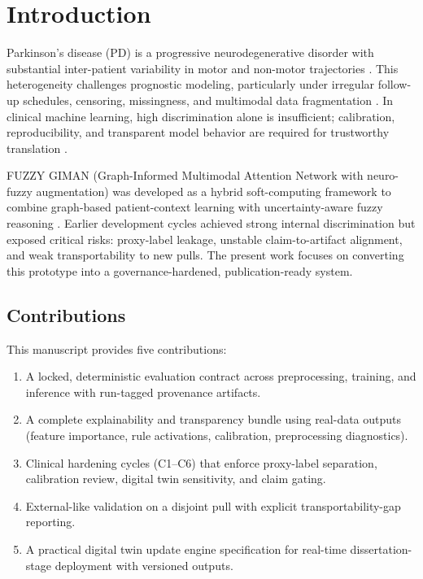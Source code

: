 \documentclass[pdflatex,sn-mathphys-num]{sn-jnl}
\begin{document}
\section{Introduction}
Parkinson's disease (PD) is a progressive neurodegenerative disorder with substantial inter-patient variability in motor and non-motor trajectories \cite{dorsey2018parkinsons,schapira2017nonmotor,poewe2017parkinson}. This heterogeneity challenges prognostic modeling, particularly under irregular follow-up schedules, censoring, missingness, and multimodal data fragmentation \cite{marek2011ppmi,holden2018progression}. In clinical machine learning, high discrimination alone is insufficient; calibration, reproducibility, and transparent model behavior are required for trustworthy translation \cite{holzinger2019causability,guo2017calibration,moons2012risk}.

FUZZY GIMAN (Graph-Informed Multimodal Attention Network with neuro-fuzzy augmentation) was developed as a hybrid soft-computing framework to combine graph-based patient-context learning with uncertainty-aware fuzzy reasoning \cite{zadeh1994soft,zadeh1965fuzzy,jang1993anfis,velickovic2018graph}. Earlier development cycles achieved strong internal discrimination but exposed critical risks: proxy-label leakage, unstable claim-to-artifact alignment, and weak transportability to new pulls. The present work focuses on converting this prototype into a governance-hardened, publication-ready system.

\subsection{Contributions}
This manuscript provides five contributions:
\begin{enumerate}
\item A locked, deterministic evaluation contract across preprocessing, training, and inference with run-tagged provenance artifacts.
\item A complete explainability and transparency bundle using real-data outputs (feature importance, rule activations, calibration, preprocessing diagnostics).
\item Clinical hardening cycles (C1--C6) that enforce proxy-label separation, calibration review, digital twin sensitivity, and claim gating.
\item External-like validation on a disjoint pull with explicit transportability-gap reporting.
\item A practical digital twin update engine specification for real-time dissertation-stage deployment with versioned outputs.
\end{enumerate}
\end{document}
